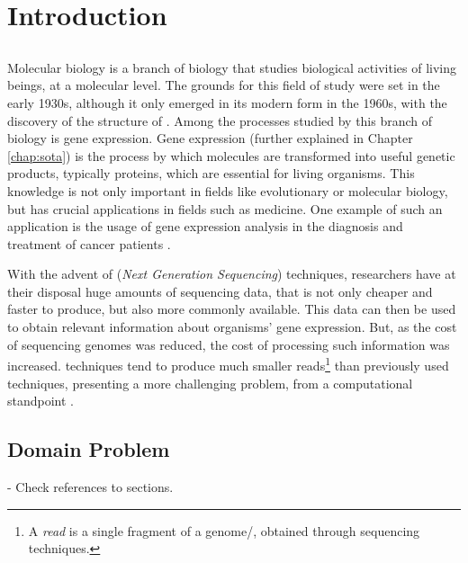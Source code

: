 \chapter{Introduction} \label{chap:intro}

\section*{}


Molecular biology is a branch of biology that studies biological activities of
living beings, at a molecular level. The grounds for this field of study were
set in the early 1930s, although it only emerged in its modern form in the
1960s, with the discovery of the structure of \dna. Among the processes studied
by this branch of biology is gene expression. Gene expression (further explained
in Chapter \ref{chap:sota}) is the process by which \dna{} molecules are
transformed into useful genetic products, typically proteins, which are
essential for living organisms. This knowledge is not only important in fields
like evolutionary or molecular biology, but has crucial applications in fields
such as medicine. One example of such an application is the usage of gene
expression analysis in the diagnosis and treatment of cancer patients
\cite{Pusztai01062003}.

With the advent of \ngs{} (\textit{Next Generation Sequencing}) techniques,
researchers have at their disposal huge amounts of sequencing data, that is not
only cheaper and faster to produce, but also more commonly available. This data
can then be used to obtain relevant information about organisms' gene
expression. But, as the cost of sequencing genomes was reduced, the cost of
processing such information was increased. \ngs{} techniques tend to produce
much smaller reads\footnote{A \textit{read} is a single fragment of a
genome/\trans, obtained through sequencing techniques.} than previously used
techniques, presenting a more challenging problem, from a computational
standpoint \cite{Wolf2013}.

\section{Domain Problem} \label{sec:problem}

\begin{Notes}
- Check references to sections.\\
\end{Notes}

